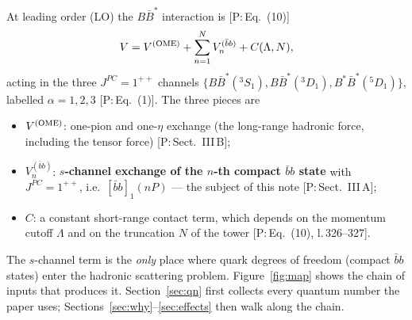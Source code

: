 \documentclass[11pt,a4paper]{article}
\newcommand{\tagP}[1]{\textcolor{blue!65!black}{\textsf{\small[P:\,#1]}}}
\newcommand{\BBst}{B\bar B^*}
\newcommand{\BstBst}{B^*\bar B^*}
\newcommand{\VQQ}{V^{(\bar bb)}}
\newcommand{\VOME}{V^{\rm (OME)}}
\newcommand{\bbnP}{[\bar bb]_1(nP)}
\begin{document}
At leading order (LO) the $\BBst$ interaction is \tagP{Eq.~(10)}
\begin{equation}
V=\VOME+\sum_{n=1}^{N}\VQQ_n+C(\Lambda,N),
\label{eq:Vdef}
\end{equation}
acting in the three $J^{PC}=1^{++}$ channels $\{\BBst(^3S_1),\BBst(^3D_1),\BstBst(^5D_1)\}$, labelled $\alpha=1,2,3$ \tagP{Eq.~(1)}. The three pieces are
\begin{itemize}
\item $\VOME$: one-pion and one-$\eta$ exchange (the long-range hadronic force, including the tensor force) \tagP{Sect.~III\,B};
\item $\VQQ_n$: \textbf{$s$-channel exchange of the $n$-th compact $\bar bb$ state} with $J^{PC}=1^{++}$, i.e.\ $\bbnP$ --- the subject of this note \tagP{Sect.~III\,A};
\item $C$: a constant short-range contact term, which depends on the momentum cutoff $\Lambda$ and on the truncation $N$ of the tower \tagP{Eq.~(10), l.\,326--327}.
\end{itemize}
The $s$-channel term is the \emph{only} place where quark degrees of freedom (compact $\bar bb$ states) enter the hadronic scattering problem. Figure~\ref{fig:map} shows the chain of inputs that produces it. Section~\ref{sec:qn} first collects every quantum number the paper uses; Sections~\ref{sec:why}--\ref{sec:effects} then walk along the chain.
\end{document}
